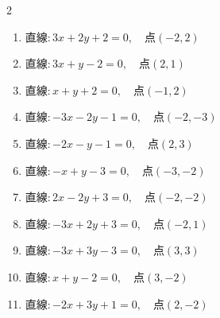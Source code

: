 \begin{multicols}{2}
\begin{enumerate}

  \item $直線:3x+2y+2=0,\quad 点 ( -2, 2 )$

        \phantom{$\displaystyle 距離 : 0$}

  \item $直線:3x+y-2=0,\quad 点 ( 2, 1 )$


  \item $直線:x+y+2=0,\quad 点 ( -1, 2 )$


\columnbreak %

  \item $直線:-3x-2y-1=0,\quad 点 ( -2, -3 )$


  \item $直線:-2x-y-1=0,\quad 点 ( 2, 3 )$


  \item $直線:-x+y-3=0,\quad 点 ( -3, -2 )$


  \item $直線:2x-2y+3=0,\quad 点 ( -2, -2 )$


  \item $直線:-3x+2y+3=0,\quad 点 ( -2, 1 )$


  \item $直線:-3x+3y-3=0,\quad 点 ( 3, 3 )$


  \item $直線:x+y-2=0,\quad 点 ( 3, -2 )$


  \item $直線:-2x+3y+1=0,\quad 点 ( 2, -2 )$



\end{enumerate}
\end{multicols}
